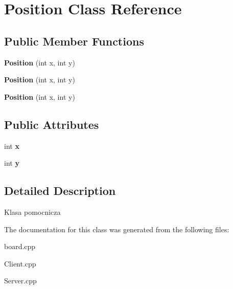 \hypertarget{classPosition}{\section{Position Class Reference}
\label{classPosition}
}
\subsection*{Public Member Functions}
\begin{DoxyCompactItemize}
\item 
\hypertarget{classPosition_a6e36cf0fee251e74cfedb86f4e99558d}{{\bfseries Position} (int x, int y)}\label{classPosition_a6e36cf0fee251e74cfedb86f4e99558d}

\item 
\hypertarget{classPosition_a6e36cf0fee251e74cfedb86f4e99558d}{{\bfseries Position} (int x, int y)}\label{classPosition_a6e36cf0fee251e74cfedb86f4e99558d}

\item 
\hypertarget{classPosition_a6e36cf0fee251e74cfedb86f4e99558d}{{\bfseries Position} (int x, int y)}\label{classPosition_a6e36cf0fee251e74cfedb86f4e99558d}

\end{DoxyCompactItemize}
\subsection*{Public Attributes}
\begin{DoxyCompactItemize}
\item 
\hypertarget{classPosition_aeda152ffeee17ae5be9c02327b2408d8}{int {\bfseries x}}\label{classPosition_aeda152ffeee17ae5be9c02327b2408d8}

\item 
\hypertarget{classPosition_a3c08e9213d4726b21caba3073192c4a3}{int {\bfseries y}}\label{classPosition_a3c08e9213d4726b21caba3073192c4a3}

\end{DoxyCompactItemize}


\subsection{Detailed Description}
Klasa pomocnicza 

The documentation for this class was generated from the following files\-:\begin{DoxyCompactItemize}
\item 
board.\-cpp\item 
Client.\-cpp\item 
Server.\-cpp\end{DoxyCompactItemize}
